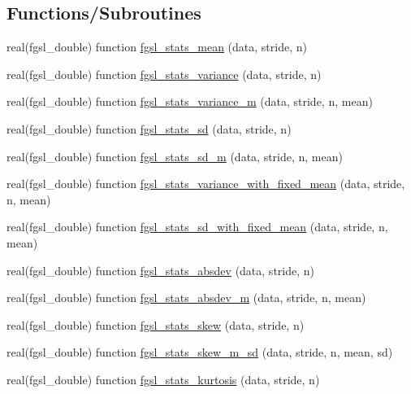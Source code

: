 \subsection*{Functions/\-Subroutines}
\begin{DoxyCompactItemize}
\item 
real(fgsl\-\_\-double) function \hyperlink{statistics_8finc_a13ad6bf10a4daeba24e77b90512a2e04}{fgsl\-\_\-stats\-\_\-mean} (data, stride, n)
\item 
real(fgsl\-\_\-double) function \hyperlink{statistics_8finc_abd5a6101ce9b7e8278e6b9843c92e121}{fgsl\-\_\-stats\-\_\-variance} (data, stride, n)
\item 
real(fgsl\-\_\-double) function \hyperlink{statistics_8finc_a82ebcf08a4a62d8acd2cd4516e655092}{fgsl\-\_\-stats\-\_\-variance\-\_\-m} (data, stride, n, mean)
\item 
real(fgsl\-\_\-double) function \hyperlink{statistics_8finc_ad6a8382d4b0eaf033302a684a19c48d7}{fgsl\-\_\-stats\-\_\-sd} (data, stride, n)
\item 
real(fgsl\-\_\-double) function \hyperlink{statistics_8finc_a2b705cc724e72bbfaab255052b08b4aa}{fgsl\-\_\-stats\-\_\-sd\-\_\-m} (data, stride, n, mean)
\item 
real(fgsl\-\_\-double) function \hyperlink{statistics_8finc_a6b816113373329675a28ef28d833fda2}{fgsl\-\_\-stats\-\_\-variance\-\_\-with\-\_\-fixed\-\_\-mean} (data, stride, n, mean)
\item 
real(fgsl\-\_\-double) function \hyperlink{statistics_8finc_a940f39032c1dcf2fc8ec83114169ded5}{fgsl\-\_\-stats\-\_\-sd\-\_\-with\-\_\-fixed\-\_\-mean} (data, stride, n, mean)
\item 
real(fgsl\-\_\-double) function \hyperlink{statistics_8finc_a63ca760a17cd6d3109ff5cfd2c0c0fc1}{fgsl\-\_\-stats\-\_\-absdev} (data, stride, n)
\item 
real(fgsl\-\_\-double) function \hyperlink{statistics_8finc_a776af1d0102b9c73f4839963012a066f}{fgsl\-\_\-stats\-\_\-absdev\-\_\-m} (data, stride, n, mean)
\item 
real(fgsl\-\_\-double) function \hyperlink{statistics_8finc_afa3dfb29e31d3a70b48eb755419ff252}{fgsl\-\_\-stats\-\_\-skew} (data, stride, n)
\item 
real(fgsl\-\_\-double) function \hyperlink{statistics_8finc_abe7a2765433ae6d8d5b01871079bc214}{fgsl\-\_\-stats\-\_\-skew\-\_\-m\-\_\-sd} (data, stride, n, mean, sd)
\item 
real(fgsl\-\_\-double) function \hyperlink{statistics_8finc_ab717a41e26eca4a329a3b1ba8ad49e36}{fgsl\-\_\-stats\-\_\-kurtosis} (data, stride, n)

\end{DoxyCompactItemize}
